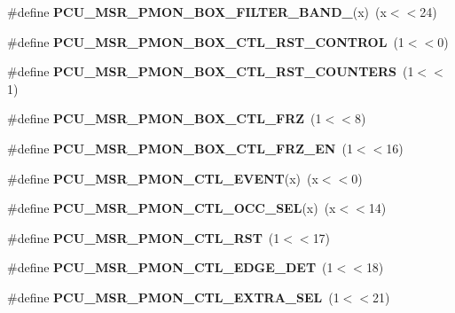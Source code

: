 \begin{DoxyCompactItemize}
\item 
\#define {\bfseries P\+C\+U\+\_\+\+M\+S\+R\+\_\+\+P\+M\+O\+N\+\_\+\+B\+O\+X\+\_\+\+F\+I\+L\+T\+E\+R\+\_\+\+B\+A\+N\+D\+\_}(x)~(x$<$$<$24)\label{types_8h_a658de4ac1d9ff7e867cb1a8f2234a30b}

\item 
\#define {\bfseries P\+C\+U\+\_\+\+M\+S\+R\+\_\+\+P\+M\+O\+N\+\_\+\+B\+O\+X\+\_\+\+C\+T\+L\+\_\+\+R\+S\+T\+\_\+\+C\+O\+N\+T\+R\+O\+L}~(1$<$$<$0)\label{types_8h_ae9f193e896a597c5cf2068ed6c876d53}

\item 
\#define {\bfseries P\+C\+U\+\_\+\+M\+S\+R\+\_\+\+P\+M\+O\+N\+\_\+\+B\+O\+X\+\_\+\+C\+T\+L\+\_\+\+R\+S\+T\+\_\+\+C\+O\+U\+N\+T\+E\+R\+S}~(1$<$$<$1)\label{types_8h_a049ae39c73f052e90d9550b6f70ebe61}

\item 
\#define {\bfseries P\+C\+U\+\_\+\+M\+S\+R\+\_\+\+P\+M\+O\+N\+\_\+\+B\+O\+X\+\_\+\+C\+T\+L\+\_\+\+F\+R\+Z}~(1$<$$<$8)\label{types_8h_a3bc14b2ee027440b7421980f6ce8ef67}

\item 
\#define {\bfseries P\+C\+U\+\_\+\+M\+S\+R\+\_\+\+P\+M\+O\+N\+\_\+\+B\+O\+X\+\_\+\+C\+T\+L\+\_\+\+F\+R\+Z\+\_\+\+E\+N}~(1$<$$<$16)\label{types_8h_ab1a7a6f5d6975ed746bd7a7580c2a8a5}

\item 
\#define {\bfseries P\+C\+U\+\_\+\+M\+S\+R\+\_\+\+P\+M\+O\+N\+\_\+\+C\+T\+L\+\_\+\+E\+V\+E\+N\+T}(x)~(x$<$$<$0)\label{types_8h_a83fbe5979fa825319e970545a9e19f00}

\item 
\#define {\bfseries P\+C\+U\+\_\+\+M\+S\+R\+\_\+\+P\+M\+O\+N\+\_\+\+C\+T\+L\+\_\+\+O\+C\+C\+\_\+\+S\+E\+L}(x)~(x$<$$<$14)\label{types_8h_ab9900f6f77c855389143ff08432a5df9}

\item 
\#define {\bfseries P\+C\+U\+\_\+\+M\+S\+R\+\_\+\+P\+M\+O\+N\+\_\+\+C\+T\+L\+\_\+\+R\+S\+T}~(1$<$$<$17)\label{types_8h_a82e19ea013584abedf7586ea123f9279}

\item 
\#define {\bfseries P\+C\+U\+\_\+\+M\+S\+R\+\_\+\+P\+M\+O\+N\+\_\+\+C\+T\+L\+\_\+\+E\+D\+G\+E\+\_\+\+D\+E\+T}~(1$<$$<$18)\label{types_8h_a532fef251bd127d9c02ce16cc3326334}

\item 
\#define {\bfseries P\+C\+U\+\_\+\+M\+S\+R\+\_\+\+P\+M\+O\+N\+\_\+\+C\+T\+L\+\_\+\+E\+X\+T\+R\+A\+\_\+\+S\+E\+L}~(1$<$$<$21)\label{types_8h_a9635a71dd27c355a9c98b73267d2a15e}


\end{DoxyCompactItemize}

